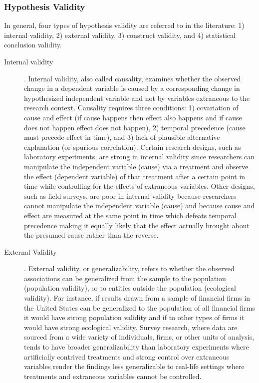 \subsubsection{Hypothesis Validity}

In general, four types of hypothesis validity are referred to in the literature: 1) internal validity, 2) external validity, 3) construct validity, and 4) statistical conclusion validity.

\begin{description}
	\item[Internal validity]. Internal validity, also called causality, examines whether the observed change in a dependent variable is caused by a corresponding change in hypothesized independent variable and not by variables extraneous to the research context. Causality requires three conditions: 1) covariation of cause and effect (if cause happens then effect also happens and if cause does not happen effect does not happen), 2) temporal precedence (cause must precede effect in time), and 3) lack of plausible alternative explanation (or spurious correlation). Certain research designs, such as laboratory experiments, are strong in internal validity since researchers can manipulate the independent variable (cause) via a treatment and observe the effect (dependent variable) of that treatment after a certain point in time while controlling for the effects of extraneous variables. Other designs, such as field surveys, are poor in internal validity because researchers cannot manipulate the independent variable (cause) and because cause and effect are measured at the same point in time which defeats temporal precedence making it equally likely that the effect actually brought about the presumed cause rather than the reverse. 
	
	
	\item[External Validity]. External validity, or generalizability, refers to whether the observed associations can be generalized from the sample to the population (population validity), or to entities outside the population (ecological validity). For instance, if results drawn from a sample of financial firms in the United States can be generalized to the population of all financial firms it would have strong population validity and if to other types of firms it would have strong ecological validity. Survey research, where data are sourced from a wide variety of individuals, firms, or other units of analysis, tends to have broader generalizability than laboratory experiments where artificially contrived treatments and strong control over extraneous variables render the findings less generalizable to real-life settings where treatments and extraneous variables cannot be controlled. 
	

\end{description}
